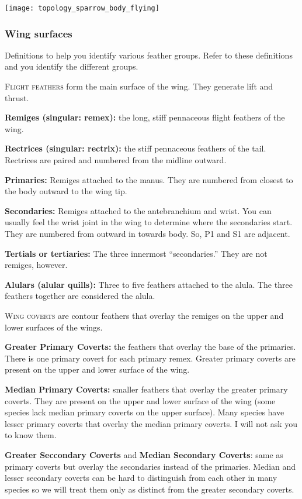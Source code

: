 \documentclass[10pt]{article}
\begin{document}
\vspace{\baselineskip}

\begin{center}
\texttt{[image: topology\_sparrow\_body\_flying]}
\end{center}

\newpage

\subsubsection*{Wing surfaces}

Definitions to help you identify various feather groups. Refer to these definitions and you identify the different groups.

\begin{multicols}{2}
	
	\textsc{Flight feathers} form the main surface of the wing. They generate lift and  thrust.
	
	\textbf{Remiges (singular: remex):} the long, stiff pennaceous flight feathers of the wing.
	
	\textbf{Rectrices (singular: rectrix):} the stiff pennaceous feathers of the tail. Rectrices are paired and numbered from the midline outward.
	
	\textbf{Primaries:} Remiges attached to the manus. They are numbered from closest to the body outward to the wing tip.
	
	\textbf{Secondaries:}  Remiges attached to the antebranchium and wrist. You can usually feel the wrist joint in the wing to determine where the secondaries start. They are numbered from outward in towards body. So, P1 and S1 are adjacent.
	
	\textbf{Tertials or tertiaries:} The three innermost “secondaries.” They are not remiges, however. 
	
	\textbf{Alulars (alular quills):} Three to five feathers attached to the alula. The three feathers together are considered the alula.
	
	\columnbreak
	
	\textsc{Wing coverts} are contour feathers that overlay the remiges on the upper and lower surfaces of the wings. 
	
	\textbf{Greater Primary Coverts:} the feathers that overlay the base of the primaries. There is one primary covert for each primary remex. Greater primary coverts are present on the upper and lower surface of the wing. 
	
	\textbf{Median Primary Coverts:} smaller feathers that overlay the greater primary coverts. They are present on the upper and lower surface of the wing (some species lack median primary coverts on the upper surface). Many species have lesser primary coverts that overlay the median primary coverts. I will not ask you to know them.
	
	\textbf{Greater Seccondary Coverts} and \textbf{Median Secondary Coverts}: same as primary coverts but overlay the secondaries instead of the primaries. Median and lesser secondary coverts can be hard to distinguish from each other in many species so we will treat them only as distinct from the greater secondary coverts.
\end{multicols}
\end{document}
